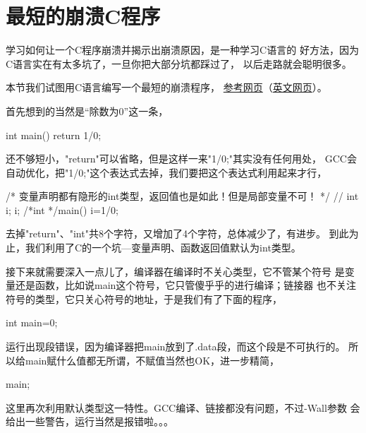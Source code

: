 \section[最短的崩溃C程序]{最短的崩溃C程序}
学习如何让一个C程序崩溃并揭示出崩溃原因，是一种学习C语言的
好方法，因为C语言实在有太多坑了，一旦你把大部分坑都踩过了，
以后走路就会聪明很多。

本节我们试图用C语言编写一个最短的崩溃程序，
\href{http://blog.jobbole.com/40286/}{参考网页}（\href{http://llbit.se/?p=1744}{英文网页}）。

首先想到的当然是“除数为0”这一条，

\begin{cppcode}
int main()
{
  return 1/0;
}
\end{cppcode}

还不够短小，"return"可以省略，但是这样一来"1/0;"其实没有任何用处，
GCC会自动优化，把"1/0;"这个表达式去掉，我们要把这个表达式利用起来才行，

\begin{cppcode}
/* 变量声明都有隐形的int类型，返回值也是如此！但是局部变量不可！ */
// int i;
i;
/*int */main()
{
  i=1/0;
}
\end{cppcode}

去掉"return"、"int"共8个字符，又增加了4个字符，总体减少了，有进步。
到此为止，我们利用了C的一个坑---变量声明、函数返回值默认为int类型。

接下来就需要深入一点儿了，编译器在编译时不关心类型，它不管某个符号
是变量还是函数，比如说main这个符号，它只管傻乎乎的进行编译；链接器
也不关注符号的类型，它只关心符号的地址，于是我们有了下面的程序，

\begin{cppcode}
int main=0;
\end{cppcode}

运行出现段错误，因为编译器把main放到了.data段，而这个段是不可执行的。
所以给main赋什么值都无所谓，不赋值当然也OK，进一步精简，

\begin{cppcode}
main;
\end{cppcode}

这里再次利用默认类型这一特性。GCC编译、链接都没有问题，不过-Wall参数
会给出一些警告，运行当然是报错啦。。。